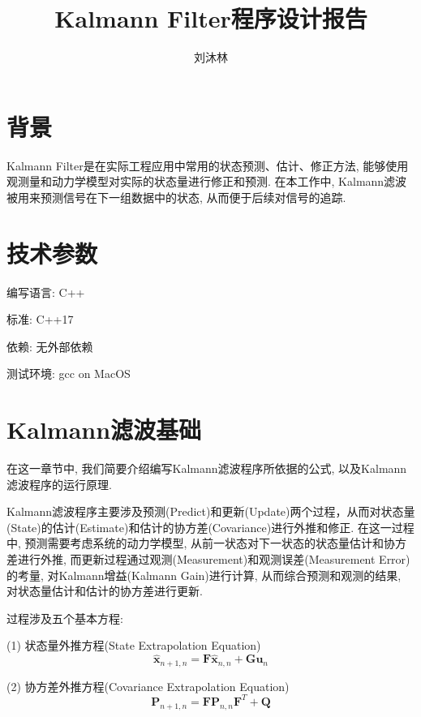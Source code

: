 \documentclass[12pt]{article}
\title{Kalmann Filter程序设计报告}
\author{刘沐林}
\begin{document}
\maketitle

\tableofcontents

\section{背景}

Kalmann Filter是在实际工程应用中常用的状态预测、估计、修正方法, 能够使用观测量和动力学模型对实际的状态量进行修正和预测. 在本工作中, Kalmann滤波被用来预测信号在下一组数据中的状态, 从而便于后续对信号的追踪.

\section{技术参数}

编写语言: C++

标准: C++17

依赖: 无外部依赖

测试环境: gcc on MacOS

\section{Kalmann滤波基础}

在这一章节中, 我们简要介绍编写Kalmann滤波程序所依据的公式, 以及Kalmann滤波程序的运行原理.

Kalmann滤波程序主要涉及预测(Predict)和更新(Update)两个过程，从而对状态量(State)的估计(Estimate)和估计的协方差(Covariance)进行外推和修正. 在这一过程中, 预测需要考虑系统的动力学模型, 从前一状态对下一状态的状态量估计和协方差进行外推, 而更新过程通过观测(Measurement)和观测误差(Measurement Error)的考量, 对Kalmann增益(Kalmann Gain)进行计算, 从而综合预测和观测的结果, 对状态量估计和估计的协方差进行更新.

过程涉及五个基本方程: 

(1) 状态量外推方程(State Extrapolation Equation)
\begin{equation} \label{eq:state_extrapolation_equation}
\hat{\bm{x}}_{n+1,n} = \bm{F} \hat{\bm{x}}_{n,n} + \bm{G} \bm{u}_n
\end{equation}

(2) 协方差外推方程(Covariance Extrapolation Equation)
\begin{equation} \label{eq:convariance_extrapolation_equation}
\bm{P}_{n+1,n} = \bm{F}\bm{P}_{n,n}\bm{F}^T + \bm{Q}
\end{equation}
\end{document}
